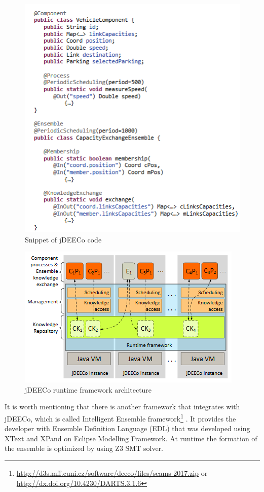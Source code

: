 \begin{figure}[!h]
\centering
\includegraphics[scale=0.70]{figures/deeco_code}
\caption{Snippet of jDEECo code}
\label{fig:deeco_code}
\end{figure}

\begin{figure}[!h]
\centering
\includegraphics[width=\textwidth]{figures/jdeeco}
\caption{jDEECo runtime framework architecture}
\label{fig:ros}
\end{figure}

 It is worth mentioning that there is another framework that integrates with jDEECo, which is called Intelligent Ensemble framework\footnote{\url{http://d3s.mff.cuni.cz/software/deeco/files/seams-2017.zip} or \url{http://dx.doi.org/10.4230/DARTS.3.1.6}} \cite{Krijt2017Intelligent}. It provides the developer with Ensemble Definition Language (EDL) that was developed using XText and XPand on Eclipse Modelling Framework. At runtime the formation of the ensemble is optimized by using Z3 SMT solver.  
 
